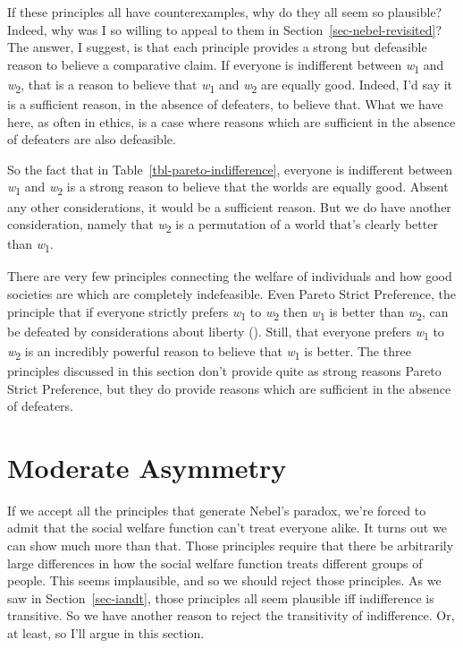\documentclass[
  11pt,
  letterpaper,
  DIV=11,
  numbers=noendperiod,
  twoside]{scrartcl}
\begin{document}
If these principles all have counterexamples, why do they all seem so
plausible? Indeed, why was I so willing to appeal to them in
Section~\ref{sec-nebel-revisited}? The answer, I suggest, is that each
principle provides a strong but defeasible reason to believe a
comparative claim. If everyone is indifferent between
\emph{w}\textsubscript{1} and \emph{w}\textsubscript{2}, that is a
reason to believe that \emph{w}\textsubscript{1} and
\emph{w}\textsubscript{2} are equally good. Indeed, I'd say it is a
sufficient reason, in the absence of defeaters, to believe that. What we
have here, as often in ethics, is a case where reasons which are
sufficient in the absence of defeaters are also defeasible.

So the fact that in Table~\ref{tbl-pareto-indifference}, everyone is
indifferent between \emph{w}\textsubscript{1} and
\emph{w}\textsubscript{2} is a strong reason to believe that the worlds
are equally good. Absent any other considerations, it would be a
sufficient reason. But we do have another consideration, namely that
\emph{w}\textsubscript{2} is a permutation of a world that's clearly
better than \emph{w}\textsubscript{1}.

There are very few principles connecting the welfare of individuals and
how good societies are which are completely indefeasible. Even Pareto
Strict Preference, the principle that if everyone strictly prefers
\emph{w}\textsubscript{1} to \emph{w}\textsubscript{2} then
\emph{w}\textsubscript{1} is better than \emph{w}\textsubscript{2}, can
be defeated by considerations about liberty (). Still, that everyone prefers \emph{w}\textsubscript{1} to
\emph{w}\textsubscript{2} is an incredibly powerful reason to believe
that \emph{w}\textsubscript{1} is better. The three principles discussed
in this section don't provide quite as strong reasons Pareto Strict
Preference, but they do provide reasons which are sufficient in the
absence of defeaters.

\section{Moderate Asymmetry}\label{sec-moderate}

If we accept all the principles that generate Nebel's paradox, we're
forced to admit that the social welfare function can't treat everyone
alike. It turns out we can show much more than that. Those principles
require that there be arbitrarily large differences in how the social
welfare function treats different groups of people. This seems
implausible, and so we should reject those principles. As we saw in
Section~\ref{sec-iandt}, those principles all seem plausible iff
indifference is transitive. So we have another reason to reject the
transitivity of indifference. Or, at least, so I'll argue in this
section.
\end{document}
